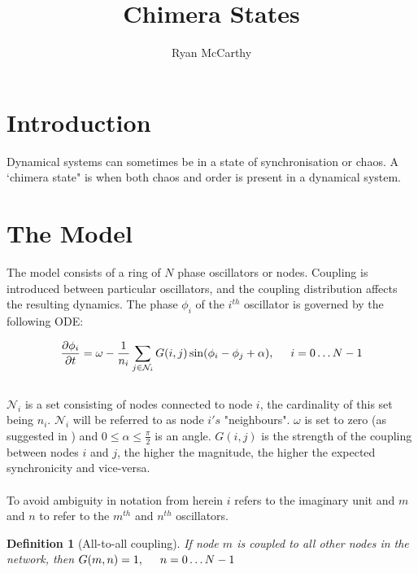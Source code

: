 \documentclass{article}
\newtheorem{dfn}{Definition}[section]
\begin{document}
\title{Chimera States}
\author{Ryan McCarthy}
\date{} %
\maketitle

\section{Introduction}
Dynamical systems can sometimes be in a state of synchronisation or chaos. A `chimera state" is when both chaos and order is present in a dynamical system.

\section{The Model}

\label{sec:The ODE}

The model consists of a ring of $N$ phase oscillators or nodes. Coupling is introduced between particular oscillators, and the coupling distribution affects the resulting dynamics. The phase $\phi_i$ of the $i^{th}$ oscillator is governed by the following ODE:

\begin{equation}
\label{eq:ODE}
\frac{\partial \phi_i}{\partial t} = \omega - \frac{1}{n_i} \sum\limits_{j\in{\mathcal{N}_i}}^{} G(i,j)\sin(\phi_i - \phi_j + \alpha), \hspace{5mm}i = 0\ldots N-1 
\end{equation}
\\
$\mathcal{N}_i$ is a set consisting of nodes connected to node $i$, the cardinality of this set being $n_i$. $\mathcal{N}_i$ will be referred to as node $i's$ "neighbours". $\omega$ is set to zero (as suggested in \cite{bib:AbramsStrogatz}) and $0\leq\alpha \leq\frac{\pi}{2} $ is an angle. $G(i,j)$ is the strength of the coupling between nodes $i$ and $j$, the higher the magnitude, the higher the expected synchronicity and vice-versa.
\\
\\
To avoid ambiguity in notation from herein $i$ refers to the imaginary unit and $m$ and $n$ to refer to the $m^{th}$ and $n^{th}$ oscillators. 

\begin{dfn}[All-to-all coupling]
If node $m$ is coupled to all other nodes in the network, then $G(m,n)=1, \hspace{5mm}n = 0\ldots N-1$
\end{dfn}
\end{document}
